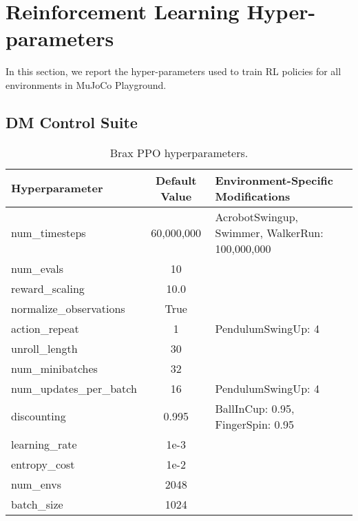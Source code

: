\section{Reinforcement Learning Hyper-parameters}
\label{sec:rl_hypers}

In this section, we report the hyper-parameters used to train RL policies for all environments in MuJoCo Playground.

\subsection{DM Control Suite}

\begin{table}[ht]
\centering
\begin{tabular}{|l|c|p{5cm}|} 
\hline
\textbf{Hyperparameter} & \textbf{Default Value} & \textbf{Environment-Specific Modifications} \\ \hline
num\_timesteps & 60,000,000 & AcrobotSwingup, Swimmer, WalkerRun: 100,000,000 \\ \hline
num\_evals & 10 &  \\ \hline
reward\_scaling & 10.0 &  \\ \hline
normalize\_observations & True &  \\ \hline
action\_repeat & 1 & PendulumSwingUp: 4 \\ \hline
unroll\_length & 30 &  \\ \hline
num\_minibatches & 32 &  \\ \hline
num\_updates\_per\_batch & 16 & PendulumSwingUp: 4 \\ \hline
discounting & 0.995 & BallInCup: 0.95, \newline FingerSpin: 0.95 \\ \hline
learning\_rate & 1e-3 &  \\ \hline
entropy\_cost & 1e-2 &  \\ \hline
num\_envs & 2048 &  \\ \hline
batch\_size & 1024 &  \\ \hline
\end{tabular}
\caption{Brax PPO hyperparameters.}
\end{table}

